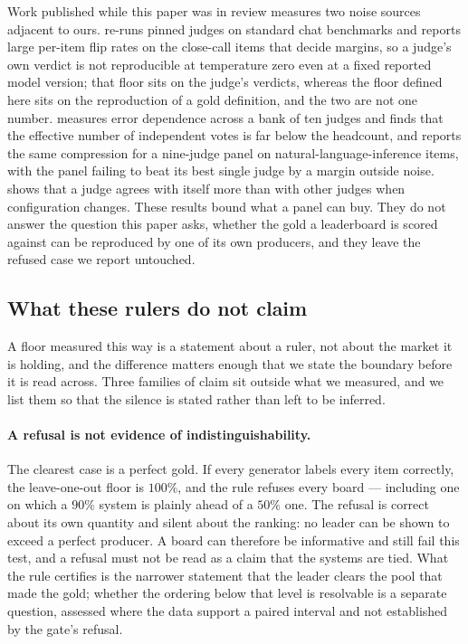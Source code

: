 \documentclass{article}
\begin{document}
Work published while this paper was in review measures two noise sources adjacent to ours. \cite{ayyagari2026pinned} re-runs pinned judges on standard chat benchmarks and reports large per-item flip rates on the close-call items that decide margins, so a judge's own verdict is not reproducible at temperature zero even at a fixed reported model version; that floor sits on the judge's verdicts, whereas the floor defined here sits on the reproduction of a gold definition, and the two are not one number. \cite{hossain2026agreement} measures error dependence across a bank of ten judges and finds that the effective number of independent votes is far below the headcount, and \cite{kohli2026nine} reports the same compression for a nine-judge panel on natural-language-inference items, with the panel failing to beat its best single judge by a margin outside noise. \cite{kassler2026measuring} shows that a judge agrees with itself more than with other judges when configuration changes. These results bound what a panel can buy. They do not answer the question this paper asks, whether the gold a leaderboard is scored against can be reproduced by one of its own producers, and they leave the refused case we report untouched.

\subsection{What these rulers do not claim}
\label{sec:notclaim} A floor measured this way is a statement about a ruler, not about the market it is holding, and the difference matters enough that we state the boundary before it is read across. Three families of claim sit outside what we measured, and we list them so that the silence is stated rather than left to be inferred.

\paragraph{A refusal is not evidence of indistinguishability.} The clearest case is a perfect gold. If every generator labels every item correctly, the leave-one-out floor is $100\%$, and the rule refuses every board --- including one on which a $90\%$ system is plainly ahead of a $50\%$ one. The refusal is correct about its own quantity and silent about the ranking: no leader can be shown to exceed a perfect producer. A board can therefore be informative and still fail this test, and a refusal must not be read as a claim that the systems are tied. What the rule certifies is the narrower statement that the leader clears the pool that made the gold; whether the ordering below that level is resolvable is a separate question, assessed where the data support a paired interval and not established by the gate's refusal.
\end{document}
